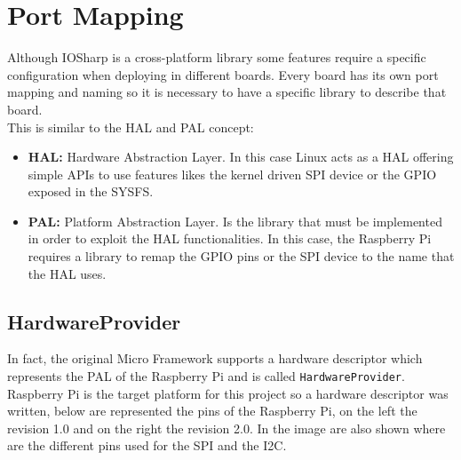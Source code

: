 \section{Port Mapping}\label{S:Port-Mapping}
Although IOSharp is a cross-platform library some features require a specific configuration when deploying in different boards. Every board has its own port mapping and naming so it is necessary to have a specific library to describe that board.
\\
This is similar to the \gls{HAL} and \gls{PAL} concept:
\begin{itemize}
\item \textbf{HAL:} Hardware Abstraction Layer. In this case Linux acts as a HAL offering simple APIs to use features likes the kernel driven SPI device or the GPIO exposed in the SYSFS.
\item \textbf{PAL:} Platform Abstraction Layer. Is the library that must be implemented in order to exploit the HAL functionalities. In this case, the Raspberry Pi requires a library to remap the GPIO pins or the SPI device to the name that the HAL uses.
\end{itemize}

\subsection{HardwareProvider}\label{SS:HardwareProvider}
In fact, the original Micro Framework supports a hardware descriptor which represents the \gls{PAL} of the Raspberry Pi and is called \verb!HardwareProvider!. Raspberry Pi is the target platform for this project so a hardware descriptor was written, below are represented the pins of the Raspberry Pi, on the left the revision 1.0 and on the right the revision 2.0. In the image are also shown where are the different pins used for the SPI and the \gls{I2C}.

